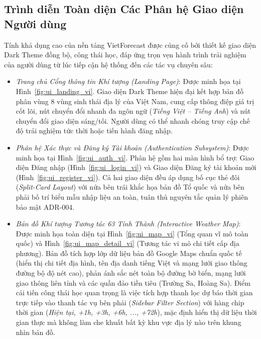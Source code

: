 \subsection{Trình diễn Toàn diện Các Phân hệ Giao diện Người dùng}
Tính khả dụng cao của nền tảng VietForecast được củng cố bởi thiết kế giao diện Dark Theme đồng bộ, công thái học, đáp ứng trọn vẹn hành trình trải nghiệm của người dùng từ lúc tiếp cận hệ thống đến các tác vụ chuyên sâu:
\begin{itemize}
    \item[-] \textit{Trang chủ Cổng thông tin Khí tượng (Landing Page)}: Được minh họa tại Hình~\ref{fig:ui_landing_vi}. Giao diện Dark Theme hiện đại kết hợp bản đồ phân vùng 8 vùng sinh thái địa lý của Việt Nam, cung cấp thông điệp giá trị cốt lõi, nút chuyển đổi nhanh đa ngôn ngữ (\textit{Tiếng Việt -- Tiếng Anh}) và nút chuyển đổi giao diện sáng/tối. Người dùng có thể nhanh chóng truy cập chế độ trải nghiệm tức thời hoặc tiến hành đăng nhập.
    \item[-] \textit{Phân hệ Xác thực và Đăng ký Tài khoản (Authentication Subsystem)}: Được minh họa tại Hình~\ref{fig:ui_auth_vi}. Phân hệ gồm hai màn hình bổ trợ: Giao diện Đăng nhập (Hình~\ref{fig:ui_login_vi}) và Giao diện Đăng ký tài khoản mới (Hình~\ref{fig:ui_register_vi}). Cả hai giao diện đều áp dụng bố cục thẻ đôi (\textit{Split-Card Layout}) với nửa bên trái khắc họa bản đồ Tổ quốc và nửa bên phải bố trí biểu mẫu nhập liệu an toàn, tuân thủ nguyên tắc quản lý phiên bảo mật ADR-004.
    \item[-] \textit{Bản đồ Khí tượng Tương tác 63 Tỉnh Thành (Interactive Weather Map)}: Được minh họa toàn diện tại Hình~\ref{fig:ui_map_vi} (Tổng quan vĩ mô toàn quốc) và Hình~\ref{fig:ui_map_detail_vi} (Tương tác vi mô chi tiết cấp địa phương). Bản đồ tích hợp lớp dữ liệu bản đồ Google Maps chuẩn quốc tế (hiển thị chi tiết địa hình, tên địa danh tiếng Việt và mạng lưới giao thông đường bộ độ nét cao), phản ánh sắc nét toàn bộ đường bờ biển, mạng lưới giao thông liên tỉnh và các quần đảo tiền tiêu (Trường Sa, Hoàng Sa). Điểm cải tiến công thái học quan trọng là việc tích hợp thanh lọc dự báo thời gian trực tiếp vào thanh tác vụ bên phải (\textit{Sidebar Filter Section}) với hàng chip thời gian (\textit{Hiện tại, +1h, +3h, +6h, ..., +72h}), mặc định hiển thị dữ liệu thời gian thực mà không làm che khuất bất kỳ khu vực địa lý nào trên khung nhìn bản đồ.

\end{itemize}
